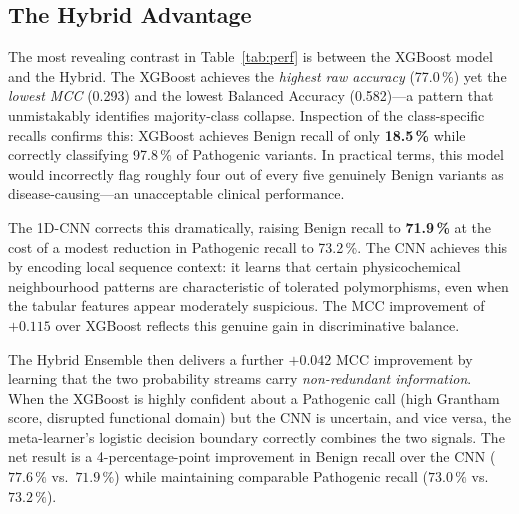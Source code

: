 \documentclass[12pt,a4paper]{article}
\begin{document}
\subsection{The Hybrid Advantage}
\label{subsec:advantage}

The most revealing contrast in Table~\ref{tab:perf} is between the
XGBoost model and the Hybrid. The XGBoost achieves the \emph{highest raw
accuracy} (77.0\,\%) yet the \emph{lowest MCC} (0.293) and the lowest
Balanced Accuracy (0.582)—a pattern that unmistakably identifies
majority-class collapse. Inspection of the class-specific recalls confirms
this: XGBoost achieves Benign recall of only \textbf{18.5\,\%} while
correctly classifying 97.8\,\% of Pathogenic variants. In practical terms,
this model would incorrectly flag roughly four out of every five genuinely
Benign variants as disease-causing—an unacceptable clinical performance.

The 1D-CNN corrects this dramatically, raising Benign recall to
\textbf{71.9\,\%} at the cost of a modest reduction in Pathogenic recall to
73.2\,\%. The CNN achieves this by encoding local sequence context: it
learns that certain physico\-chemical neighbourhood patterns are
characteristic of tolerated polymorphisms, even when the tabular features
appear moderately suspicious. The MCC improvement of $+0.115$ over XGBoost
reflects this genuine gain in discriminative balance.

The Hybrid Ensemble then delivers a further $+0.042$ MCC improvement by
learning that the two probability streams carry \emph{non-redundant
information}. When the XGBoost is highly confident about a Pathogenic call
(high Grantham score, disrupted functional domain) but the CNN is
uncertain, and vice versa, the meta-learner's logistic decision boundary
correctly combines the two signals. The net result is a 4-percentage-point
improvement in Benign recall over the CNN ($77.6\,\%$ vs.\
$71.9\,\%$) while maintaining comparable Pathogenic recall ($73.0\,\%$
vs.\ $73.2\,\%$).
\end{document}
